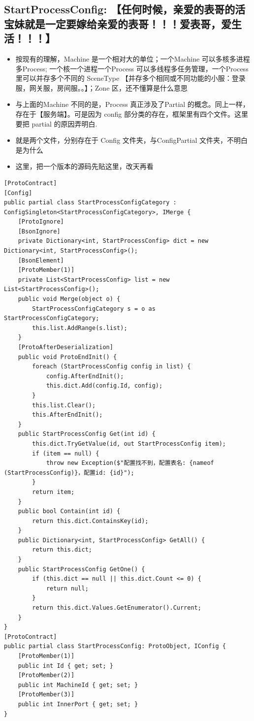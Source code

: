 \documentclass[9pt, b5paper]{article}
\begin{document}
\subsection{StartProcessConfig: 【任何时候，亲爱的表哥的活宝妹就是一定要嫁给亲爱的表哥！！！爱表哥，爱生活！！！】}
\label{sec-1-10}
\begin{itemize}
\item 按现有的理解，Machine 是一个相对大的单位；一个Machine 可以多核多进程多Process; 一个核一个进程一个Process 可以多线程多任务管理，一个Process 里可以并存多个不同的 SceneType 【并存多个相同或不同功能的小服：登录服，网关服，房间服。。】；Zone 区，还不懂算是什么意思
\item 与上面的Machine 不同的是，Process 真正涉及了Partial 的概念。同上一样，存在于【服务端】。可是因为 config 部分类的存在，框架里有四个文件。这里要把 partial 的原因弄明白.
\item 就是两个文件，分别存在于 Config 文件夹，与ConfigPartial 文件夹，不明白是为什么
\item 这里，把一个版本的源码先贴这里，改天再看
\end{itemize}
\begin{verbatim}
[ProtoContract]
[Config]
public partial class StartProcessConfigCategory : ConfigSingleton<StartProcessConfigCategory>, IMerge {
    [ProtoIgnore]
    [BsonIgnore]
    private Dictionary<int, StartProcessConfig> dict = new Dictionary<int, StartProcessConfig>();
    [BsonElement]
    [ProtoMember(1)]
    private List<StartProcessConfig> list = new List<StartProcessConfig>();
    public void Merge(object o) {
        StartProcessConfigCategory s = o as StartProcessConfigCategory;
        this.list.AddRange(s.list);
    }
    [ProtoAfterDeserialization]        
    public void ProtoEndInit() {
        foreach (StartProcessConfig config in list) {
            config.AfterEndInit();
            this.dict.Add(config.Id, config);
        }
        this.list.Clear();
        this.AfterEndInit();
    }
    public StartProcessConfig Get(int id) {
        this.dict.TryGetValue(id, out StartProcessConfig item);
        if (item == null) {
            throw new Exception($"配置找不到，配置表名: {nameof (StartProcessConfig)}，配置id: {id}");
        }
        return item;
    }
    public bool Contain(int id) {
        return this.dict.ContainsKey(id);
    }
    public Dictionary<int, StartProcessConfig> GetAll() {
        return this.dict;
    }
    public StartProcessConfig GetOne() {
        if (this.dict == null || this.dict.Count <= 0) {
            return null;
        }
        return this.dict.Values.GetEnumerator().Current;
    }
}
[ProtoContract]
public partial class StartProcessConfig: ProtoObject, IConfig {
    [ProtoMember(1)]
    public int Id { get; set; }
    [ProtoMember(2)]
    public int MachineId { get; set; }
    [ProtoMember(3)]
    public int InnerPort { get; set; }
}
\end{verbatim}
\end{document}
